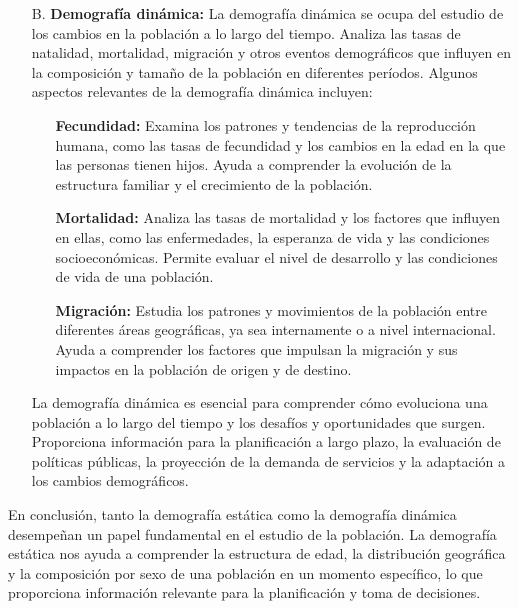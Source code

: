 \documentclass[8pt,a4paper]{beamer}
\begin{document}
{\begin{frame}{}
\begin{block}{}
\begin{enumerate}
\justifying
\item[B.] \textbf{Demografía dinámica:} La demografía dinámica se ocupa del estudio de los cambios en la población a lo largo del tiempo. Analiza las tasas de natalidad, mortalidad, migración y otros eventos demográficos que influyen en la composición y tamaño de la población en diferentes períodos. Algunos aspectos relevantes de la demografía dinámica incluyen:
\begin{itemize}
\item[\ding{99}] \textbf{Fecundidad:} Examina los patrones y tendencias de la reproducción humana, como las tasas de fecundidad y los cambios en la edad en la que las personas tienen hijos. Ayuda a comprender la evolución de la estructura familiar y el crecimiento de la población.

\item[\ding{99}] \textbf{Mortalidad:} Analiza las tasas de mortalidad y los factores que influyen en ellas, como las enfermedades, la esperanza de vida y las condiciones socioeconómicas. Permite evaluar el nivel de desarrollo y las condiciones de vida de una población.

\item[\ding{99}] \textbf{Migración:} Estudia los patrones y movimientos de la población entre diferentes áreas geográficas, ya sea internamente o a nivel internacional. Ayuda a comprender los factores que impulsan la migración y sus impactos en la población de origen y de destino.
\end{itemize}
La demografía dinámica es esencial para comprender cómo evoluciona una población a lo largo del tiempo y los desafíos y oportunidades que surgen. Proporciona información para la planificación a largo plazo, la evaluación de políticas públicas, la proyección de la demanda de servicios y la adaptación a los cambios demográficos.
\end{enumerate}
\end{block}
\end{frame}

\begin{frame}{}
\begin{block}{}
\justifying
En conclusión, tanto la demografía estática como la demografía dinámica desempeñan un papel fundamental en el estudio de la población. La demografía estática nos ayuda a comprender la estructura de edad, la distribución geográfica y la composición por sexo de una población en un momento específico, lo que proporciona información relevante para la planificación y toma de decisiones. 


\end{block}
\end{frame}}
\end{document}
